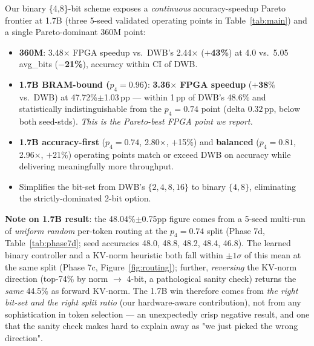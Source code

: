 \documentclass{article}
\begin{document}
\begin{table}[h]
\label{tab:main}
\end{table}

Our binary \{4,8\}-bit scheme exposes a \emph{continuous} accuracy-speedup Pareto frontier at 1.7B (three 5-seed validated operating points in Table~\ref{tab:main}) and a single Pareto-dominant 360M point:
\begin{itemize}
\item \textbf{360M}: 3.48$\times$ FPGA speedup vs.\ DWB's 2.44$\times$ (\textbf{$+$43\%}) at 4.0 vs.\ 5.05 avg\_bits (\textbf{$-$21\%}), accuracy within CI of DWB.
\item \textbf{1.7B BRAM-bound ($p_4{=}0.96$)}: \textbf{3.36$\times$ FPGA speedup} ($\mathbf{+38\%}$ vs.\ DWB) at 47.72\%$\pm$1.03\,pp --- within 1\,pp of DWB's 48.6\% and statistically indistinguishable from the $p_4{=}0.74$ point (delta $0.32$\,pp, below both seed-stds). \emph{This is the Pareto-best FPGA point we report.}
\item \textbf{1.7B accuracy-first} ($p_4{=}0.74$, 2.80$\times$, $+$15\%) and \textbf{balanced} ($p_4{=}0.81$, 2.96$\times$, $+$21\%) operating points match or exceed DWB on accuracy while delivering meaningfully more throughput.
\item Simplifies the bit-set from DWB's $\{2,4,8,16\}$ to binary $\{4,8\}$, eliminating the strictly-dominated 2-bit option.
\end{itemize}

\noindent\textbf{Note on 1.7B result}: the 48.04\%$\pm$0.75pp figure comes from a 5-seed multi-run of \emph{uniform random} per-token routing at the $p_4{=}0.74$ split (Phase 7d, Table~\ref{tab:phase7d}; seed accuracies 48.0, 48.8, 48.2, 48.4, 46.8). The learned binary controller and a KV-norm heuristic both fall within $\pm 1\sigma$ of this mean at the same split (Phase 7c, Figure~\ref{fig:routing}); further, \emph{reversing} the KV-norm direction (top-74\% by norm $\to$ 4-bit, a pathological sanity check) returns the \emph{same} 44.5\% as forward KV-norm. The 1.7B win therefore comes from \emph{the right bit-set and the right split ratio} (our hardware-aware contribution), not from any sophistication in token selection — an unexpectedly crisp negative result, and one that the sanity check makes hard to explain away as "we just picked the wrong direction".
\end{document}
